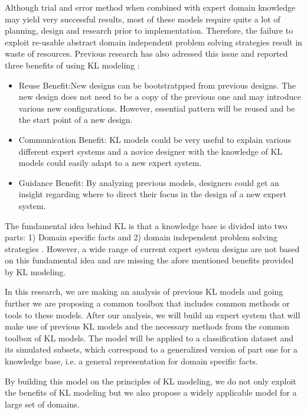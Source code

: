 \documentclass[conference]{IEEEtran}
\begin{document}
Although trial and error method when combined with expert domain knowledge may yield very successful results, most of these models require quite a lot of planning, design and research prior to implementation.
Therefore, the failure to exploit re-usable abstract domain independent problem solving strategies result in waste of resources.
Previous research has also adressed this issue and reported three benefits of using KL modeling \cite{Menzies97object-orientedpatterns:}:
\begin{itemize}
\item Reuse Benefit:New designs can be bootstratpped from previous designs. 
The new design does not need to be a copy of the previous one and may introduce various new configurations.
However, essential pattern will be reused and be the start point of a new design.
\item Communication Benefit: KL models could be very useful to explain various different expert systems and a novice designer with the knowledge of KL models could easily adapt to a new expert system.
\item Guidance Benefit: By analyzing previous models, designers could get an insight regarding where to direct their focus in the design of a new expert system.
\end{itemize}

The fundamental idea behind KL is that a knowledge base is divided into two parts: 1) Domain specific facts and 2) domain independent problem solving strategies \cite{Menzies1996}.
However, a wide range of current expert system designs are not based on this fundamental idea and are missing the afore mentioned benefits provided by KL modeling.

In this research, we are making an analysis of previous KL models and going further we are proposing a common toolbox that includes common methods or tools to these models.
After our analysis, we will build an expert system that will make use of previous KL models and the necessary methods from the common toolbox of KL models.
The model will be applied to a classification dataset and its simulated subsets, which correspond to a generalized version of part one for a knowledge base, i.e. a general representation for domain specific facts.

By building this model on the principles of KL modeling, we do not only exploit the benefits of KL modeling but we also propose a widely applicable model for a large set of domains.


\end{document}
